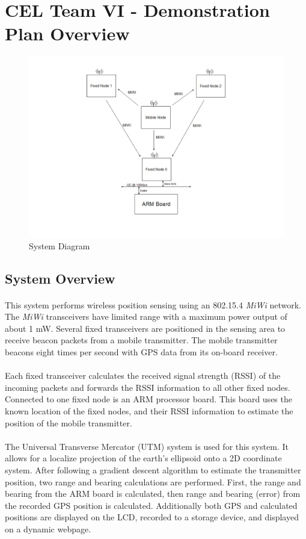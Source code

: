\documentclass[10pt,letterpaper]{article}
\begin{document}
\section*{CEL Team VI - Demonstration Plan Overview}
\begin{figure}
	\includegraphics[scale=0.5]{Overall_Poster_BD.png}
	\caption{System Diagram}
\end{figure}
\subsection*{System Overview}
\paragraph*{}
This system performs wireless position sensing using an 802.15.4 \textit{MiWi} network.  The \textit{MiWi} transceivers have limited range with a maximum
power output of about 1 mW.  Several fixed transceivers are positioned in the sensing area to receive beacon packets from a mobile transmitter.  The mobile
transmitter beacons eight times per second with GPS data from its on-board receiver.
\paragraph*{}
Each fixed transceiver calculates the received signal strength (RSSI) of the incoming packets and forwards the RSSI information to all other fixed nodes.  Connected
to one fixed node is an ARM processor board.  This board uses the known location of the fixed nodes, and their RSSI information to estimate the position of the
mobile transmitter.
\paragraph*{}
The Universal Transverse Mercator (UTM) system is used for this system.  It allows for a localize projection of the earth's ellipsoid onto a 2D coordinate system.  After
following a gradient descent algorithm to estimate the transmitter position, two range and bearing calculations are performed.  First, the range and bearing from the ARM
board is calculated, then range and bearing (error) from the recorded GPS position is calculated.  Additionally both GPS and calculated positions are displayed on the LCD,
recorded to a storage device, and displayed on a dynamic webpage.
\end{document}
